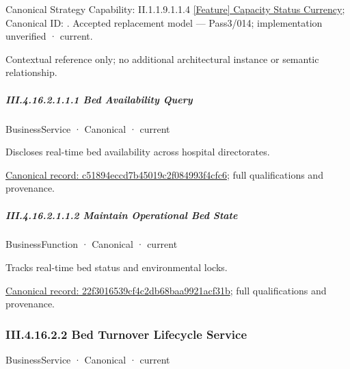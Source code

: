 {\small Canonical Strategy Capability: II.1.1.9.1.1.4 \hyperref[element:21b425fd571e4fa2a1c5b02233e1e85b]{[Feature] Capacity Status Currency}; Canonical ID: \texttt{}. Accepted replacement model — Pass3/014; implementation unverified · current.}\par
Contextual reference only; no additional architectural instance or semantic relationship.\par
\subparagraph*{III.4.16.2.1.1.1 Bed Availability Query}
\label{navigation:III.4.16.2.1.1.1}

\label{element:c51894eccd7b45019c2f084993f4cfc6}
{\small BusinessService · Canonical · current}\par

Discloses real-time bed availability across hospital directorates.


{\footnotesize \href{../../../../../../../../continuum/business/business-service/c51894eccd7b45019c2f084993f4cfc6.md}{Canonical record: c51894eccd7b45019c2f084993f4cfc6}; full qualifications and provenance.}\par
\subparagraph*{III.4.16.2.1.1.2 Maintain Operational Bed State}
\label{navigation:III.4.16.2.1.1.2}

\label{element:22f3016539cf4c2db68baa9921acf31b}
{\small BusinessFunction · Canonical · current}\par

Tracks real-time bed status and environmental locks.


{\footnotesize \href{../../../../../../../../continuum/business/business-function/22f3016539cf4c2db68baa9921acf31b.md}{Canonical record: 22f3016539cf4c2db68baa9921acf31b}; full qualifications and provenance.}\par
\subsubsection*{III.4.16.2.2 Bed Turnover Lifecycle Service}
\label{navigation:III.4.16.2.2}

\label{element:f0ab3847b1bf41869a85b1a5ef217429}
{\small BusinessService · Canonical · current}\par

